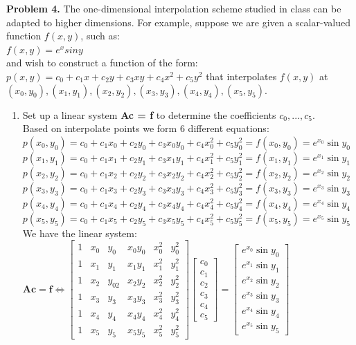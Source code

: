 \documentclass[14pt,a4paper]{article}
\begin{document}
\large\textbf{Problem 4.} The one-dimensional interpolation scheme studied in class can be adapted to higher dimensions. For example, suppose we are given a scalar-valued function $f(x,y)$, such as: \\
	\hspace*{3cm} $f(x,y) = e^xsiny$ \\
	and wish to construct a function of the form: \\
	\hspace*{3cm} $p(x,y) = c_0 + c_1x + c_2y + c_3xy + c_4x^2 + c_5y^2$
	that interpolates $f(x,y)$ at $(x_0,y_0), (x_1, y_1), (x_2, y_2), (x_3, y_3), (x_4, y_4), (x_5, y_5)$. 
	\begin{enumerate}
		\item Set up a linear system \textbf{Ac = f} to determine the coefficients $c_0, ..., c_5$.\\
		Based on interpolate points we form 6 different equations:\\
		$p(x_0,y_0) = c_0 + c_1x_0 + c_2y_0 + c_3x_0y_0 + c_4x_0^2 + c_5y_0^2 = f(x_0,y_0) = e^{x_0}\sin {y_0}$ \\
		$p(x_1,y_1) = c_0 + c_1x_1 + c_2y_1 + c_3x_1y_1 + c_4x_1^2 + c_5y_1^2 = f(x_1,y_1) = e^{x_1}\sin {y_1}$ \\
		$p(x_2,y_2) = c_0 + c_1x_2 + c_2y_2 + c_3x_2y_2 + c_4x_2^2 + c_5y_2^2 = f(x_2,y_2) = e^{x_2}\sin {y_2}$ \\
		$p(x_3,y_3) = c_0 + c_1x_3 + c_2y_3 + c_3x_3y_3 + c_4x_3^2 + c_5y_3^2 = f(x_3,y_3) = e^{x_3}\sin {y_3}$ \\
		$p(x_4,y_4) = c_0 + c_1x_4 + c_2y_4 + c_3x_4y_4 + c_4x_4^2 + c_5y_4^2 = f(x_4,y_4) = e^{x_4}\sin {y_4}$ \\
		$p(x_5,y_5) = c_0 + c_1x_5 + c_2y_5 + c_3x_5y_5 + c_4x_5^2 + c_5y_5^2 = f(x_5,y_5) = e^{x_5}\sin {y_5}$ \\
		We have the linear system:\\
		$\textbf{Ac} = \textbf{f} \Leftrightarrow \begin{bmatrix} 1&x_0&y_0&x_0y_0&x_0^2&y_0^2 \\ 1&x_1&y_1&x_1y_1&x_1^2&y_1^2 \\ 1&x_2&y_02&x_2y_2&x_2^2&y_2^2 \\ 1&x_3&y_3&x_3y_3&x_3^2&y_3^2 \\ 1&x_4&y_4&x_4y_4&x_4^2&y_4^2 \\ 1&x_5&y_5&x_5y_5&x_5^2&y_5^2 \end{bmatrix} \begin{bmatrix} c_0\\c_1\\c_2\\c_3\\c_4\\c_5 \end{bmatrix} = \begin{bmatrix} e^{x_0}\sin y_0 \\ e^{x_1}\sin y_1 \\ e^{x_2}\sin y_2 \\ e^{x_3}\sin y_3 \\ e^{x_4}\sin y_4 \\ e^{x_5}\sin y_5 \end{bmatrix} $ \\
		

\end{enumerate}
\end{document}
